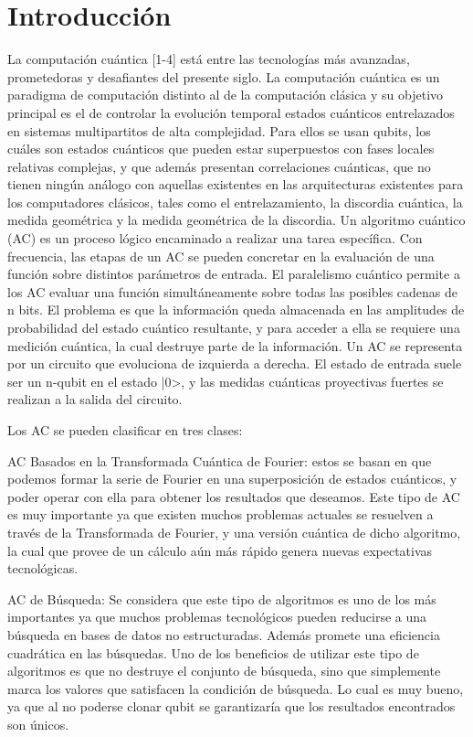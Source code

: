 \chapter{Introducción}

La computación cuántica [1-4] está entre las tecnologías más avanzadas, prometedoras y desafiantes del presente siglo. La computación cuántica es un paradigma de computación distinto al de la computación clásica y su objetivo principal es el de controlar la evolución temporal estados cuánticos entrelazados en sistemas multipartitos de alta complejidad. Para ellos se usan qubits, los cuáles son estados cuánticos que pueden estar superpuestos con fases locales relativas complejas, y que además presentan correlaciones cuánticas, que no tienen ningún análogo con aquellas existentes en las arquitecturas existentes para los computadores clásicos, tales como el entrelazamiento, la discordia cuántica, la medida geométrica y la medida geométrica de la discordia.  Un algoritmo cuántico (AC) es un proceso lógico encaminado a realizar una tarea específica. Con frecuencia, las etapas de un AC se pueden concretar en la evaluación de una función sobre distintos parámetros de entrada. El paralelismo cuántico permite a los AC evaluar una función simultáneamente sobre todas las posibles cadenas de n bits. El problema es que la información queda almacenada en las amplitudes de probabilidad del estado cuántico resultante, y para acceder a ella se requiere una medición cuántica, la cual destruye parte de la información. Un AC se representa por un circuito que evoluciona de izquierda a derecha. El estado de entrada suele ser un n-qubit en el estado |0>, y las medidas cuánticas proyectivas fuertes se realizan a la salida del circuito.

Los AC se pueden clasificar en tres clases:

AC Basados en la Transformada Cuántica de Fourier: estos se basan en que podemos formar la serie de Fourier en una superposición de estados cuánticos, y poder operar con ella para obtener los resultados que deseamos. Este tipo de AC es muy importante ya que existen muchos problemas actuales se resuelven a través de la Transformada de Fourier, y una versión cuántica de dicho algoritmo, la cual que provee de un cálculo aún más rápido genera nuevas expectativas tecnológicas.

AC de Búsqueda: Se considera que este tipo de algoritmos es uno de los más importantes ya que muchos problemas tecnológicos pueden reducirse a una búsqueda en bases de datos no estructuradas. Además promete una eficiencia cuadrática en las búsquedas. Uno de los beneficios de utilizar este tipo de algoritmos es que no destruye el conjunto de búsqueda, sino que simplemente marca los valores que satisfacen la condición de búsqueda. Lo cual es muy bueno, ya que al no poderse clonar qubit se garantizaría que los resultados encontrados son únicos.

